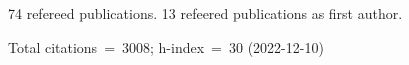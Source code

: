 74 refereed publications. 13 refeered publications as first author.

Total citations~=~3008; h-index~=~30 (2022-12-10)